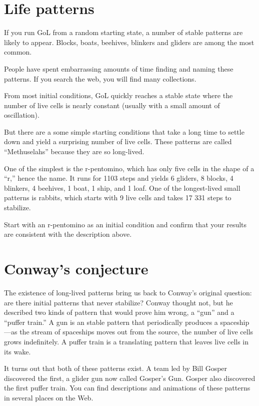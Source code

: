 \documentclass[10pt]{book}
\begin{document}
\section{Life patterns}

If you run GoL from a random starting state, a number of stable
patterns are likely to appear.  Blocks, boats, beehives, blinkers and
gliders are among the most common.

People have spent embarrassing
amounts of time finding and naming these patterns.  If you search
the web, you will find many collections.

From most initial conditions, GoL quickly reaches a stable
state where the number of live cells is nearly constant
(usually with a small amount of oscillation).

But there are a some simple starting conditions that take a
long time to settle down and yield a surprising
number of live cells.  These patterns are called ``Methuselahs''
because they are so long-lived.

One of the simplest is the
r-pentomino, which has only five cells in the shape of a ``r,'' hence
the name.  It runs for 1103 steps and yields 6 gliders, 8 blocks, 4
blinkers, 4 beehives, 1 boat, 1 ship, and 1 loaf.
One of the longest-lived small patterns is rabbits, which starts
with 9 live cells and takes 17 331 steps to stabilize.

\begin{ex}

Start with an r-pentomino as an initial condition and confirm
that your results are consistent with the description above.

\end{ex}


\section{Conway's conjecture}

The existence of long-lived patterns bring us back to Conway's
original question: are there initial patterns that never stabilize?
Conway thought not, but he described two kinds of pattern that would
prove him wrong, a ``gun'' and a ``puffer train.''  A gun is an stable
pattern that periodically produces a spaceship---as the stream of
spaceships moves out from the source, the number of live cells grows
indefinitely.  A puffer train is a translating pattern that leaves
live cells in its wake.

It turns out that both of these patterns exist.  A team led
by Bill Gosper discovered the first, a glider gun now called
Gosper's Gun.  Gosper also discovered the first puffer train.
You can find descriptions and animations of these patterns
in several places on the Web.
\end{document}
